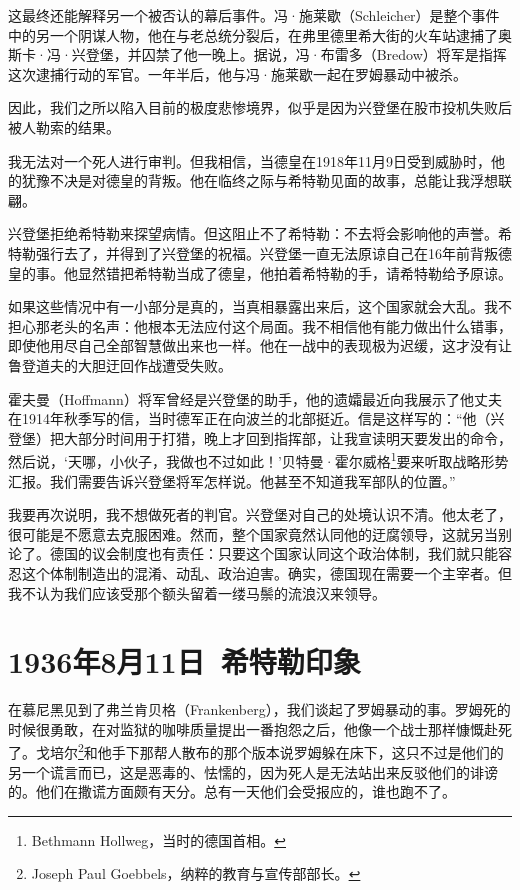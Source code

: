 \documentclass[UTF8]{ctexart}
\begin{document}
这最终还能解释另一个被否认的幕后事件。冯·施莱歇（Schleicher）是整个事件中的另一个阴谋人物，他在与老总统分裂后，在弗里德里希大街的火车站逮捕了奥斯卡·冯·兴登堡，并囚禁了他一晚上。据说，冯·布雷多（Bredow）将军是指挥这次逮捕行动的军官。一年半后，他与冯·施莱歇一起在罗姆暴动中被杀。

因此，我们之所以陷入目前的极度悲惨境界，似乎是因为兴登堡在股市投机失败后被人勒索的结果。

我无法对一个死人进行审判。但我相信，当德皇在1918年11月9日受到威胁时，他的犹豫不决是对德皇的背叛。他在临终之际与希特勒见面的故事，总能让我浮想联翩。

兴登堡拒绝希特勒来探望病情。但这阻止不了希特勒：不去将会影响他的声誉。希特勒强行去了，并得到了兴登堡的祝福。兴登堡一直无法原谅自己在16年前背叛德皇的事。他显然错把希特勒当成了德皇，他拍着希特勒的手，请希特勒给予原谅。

如果这些情况中有一小部分是真的，当真相暴露出来后，这个国家就会大乱。我不担心那老头的名声：他根本无法应付这个局面。我不相信他有能力做出什么错事，即使他用尽自己全部智慧做出来也一样。他在一战中的表现极为迟缓，这才没有让鲁登道夫的大胆迂回作战遭受失败。

霍夫曼（Hoffmann）将军曾经是兴登堡的助手，他的遗孀最近向我展示了他丈夫在1914年秋季写的信，当时德军正在向波兰的北部挺近。信是这样写的：“他（兴登堡）把大部分时间用于打猎，晚上才回到指挥部，让我宣读明天要发出的命令，然后说，‘天哪，小伙子，我做也不过如此！’贝特曼·霍尔威格\footnote{Bethmann Hollweg，当时的德国首相。}要来听取战略形势汇报。我们需要告诉兴登堡将军怎样说。他甚至不知道我军部队的位置。”

我要再次说明，我不想做死者的判官。兴登堡对自己的处境认识不清。他太老了，很可能是不愿意去克服困难。然而，整个国家竟然认同他的迂腐领导，这就另当别论了。德国的议会制度也有责任：只要这个国家认同这个政治体制，我们就只能容忍这个体制制造出的混淆、动乱、政治迫害。确实，德国现在需要一个主宰者。但我不认为我们应该受那个额头留着一缕马鬃的流浪汉来领导。

\section{1936年8月11日\ 希特勒印象}

在慕尼黑见到了弗兰肯贝格（Frankenberg），我们谈起了罗姆暴动的事。罗姆死的时候很勇敢，在对监狱的咖啡质量提出一番抱怨之后，他像一个战士那样慷慨赴死了。戈培尔\footnote{Joseph Paul Goebbels，纳粹的教育与宣传部部长。}和他手下那帮人散布的那个版本说罗姆躲在床下，这只不过是他们的另一个谎言而已，这是恶毒的、怯懦的，因为死人是无法站出来反驳他们的诽谤的。他们在撒谎方面颇有天分。总有一天他们会受报应的，谁也跑不了。
\end{document}
